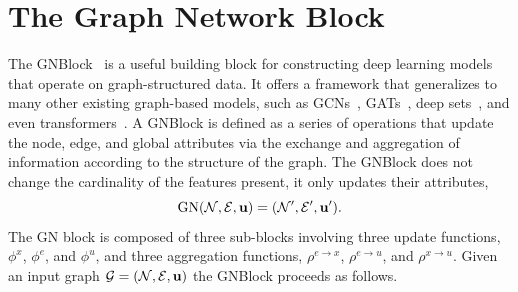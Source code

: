 \section{The Graph Network Block}
\label{sec:gn_block}

The \Gls{GNBlock}~\cite{RelationalInductiveBiases} is a useful building block for constructing deep learning models that operate on graph-structured data.
It offers a framework that generalizes to many other existing graph-based models, such as \Glspl{GCN}~\cite{GCN}, \Glspl{GAT}~\cite{GraphAttentionNetworks}, deep sets~\cite{DeepSets}, and even transformers~\cite{Attention}.
A \Gls{GNBlock} is defined as a series of operations that update the node, edge, and global attributes via the exchange and aggregation of information according to the structure of the graph.
The \Gls{GNBlock} does not change the cardinality of the features present, it only updates their attributes,
\begin{equation}
    \text{GN}(\mathcal{N}, \mathcal{E}, \mathbf{u}) = (\mathcal{N}', \mathcal{E}', \mathbf{u}').
\end{equation}
The GN block is composed of three sub-blocks involving three update functions, $\phi^x$, $\phi^e$, and $\phi^u$, and three aggregation functions, $\rho^{e \to x}$, $\rho^{e \to u}$, and $\rho^{x \to u}$.
Given an input graph $\mathcal{G} = (\mathcal{N}, \mathcal{E}, \mathbf{u})$ the \Gls{GNBlock} proceeds as follows.

